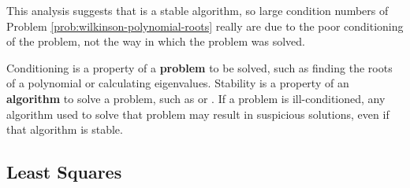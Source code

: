 This analysis suggests that  is a stable algorithm, so large condition numbers of Problem \ref{prob:wilkinson-polynomial-roots} really are due to the poor conditioning of the problem, not the way in which the problem was solved.

\begin{info} %
Conditioning is a property of a \textbf{problem} to be solved, such as finding the roots of a polynomial or calculating eigenvalues.
Stability is a property of an \textbf{algorithm} to solve a problem, such as  or .
If a problem is ill-conditioned, any algorithm used to solve that problem may result in suspicious solutions, even if that algorithm is stable.
\end{info}


\subsection*{Least Squares} %

